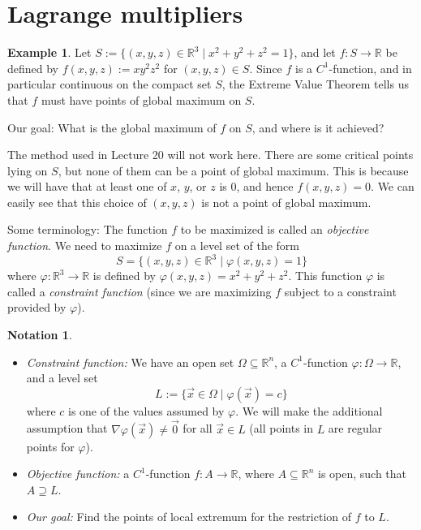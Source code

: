 \documentclass[11pt]{article}
\theoremstyle{definition}
\newtheorem{exmp}[thm]{Example}
\newtheorem{notation}[thm]{Notation}
\newcommand{\R}{\ensuremath{\mathbb{R}}}
\begin{document}
\newpage
{}
\section{Lagrange multipliers}

\begin{exmp}
Let $S := \{(x, y, z) \in \R^3 \mid x^2 + y^2 + z^2 = 1\}$, and let $f : S \to \R$ be defined by $f(x, y, z) := xy^2z^2$ for $(x, y, z) \in S$. Since $f$ is a $C^1$-function, and in particular continuous on the compact set $S$, the Extreme Value Theorem tells us that $f$ must have points of global maximum on $S$.

Our goal: What is the global maximum of $f$ on $S$, and where is it achieved?

The method used in Lecture 20 will not work here. There are some critical points lying on $S$, but none of them can be a point of global maximum. This is because we will have that at least one of $x$, $y$, or $z$ is 0, and hence $f(x, y, z) = 0$. We can easily see that this choice of $(x, y, z)$ is not a point of global maximum.

Some terminology: The function $f$ to be maximized is called an \emph{objective function}. We need to maximize $f$ on a level set of the form
$$S = \{(x, y, z) \in \R^3 \mid \varphi(x, y, z) = 1\}$$
where $\varphi : \R^3 \to \R$ is defined by $\varphi(x, y, z) = x^2 + y^2 + z^2$. This function $\varphi$ is called a \emph{constraint function} (since we are maximizing $f$ subject to a constraint provided by $\varphi$).
\end{exmp}

\begin{notation}~
\vspace{-1.5ex}\begin{itemize}
    \item \emph{Constraint function:} We have an open set $\Omega \subseteq \R^n$, a $C^1$-function $\varphi : \Omega \to \R$, and a level set
    $$L := \{\vec{x} \in \Omega \mid \varphi(\vec{x}) = c\}$$
    where $c$ is one of the values assumed by $\varphi$. We will make the additional assumption that $\nabla \varphi(\vec{x}) \neq \vec{0}$ for all $\vec{x} \in L$ (all points in $L$ are regular points for $\varphi$).
    \item \emph{Objective function:} a $C^1$-function $f : A \to \R$, where $A \subseteq \R^n$ is open, such that $A \supseteq L$.
    \item \emph{Our goal:} Find the points of local extremum for the restriction of $f$ to $L$.
\end{itemize}\vspace{-1.5ex}
\end{notation}
\end{document}
